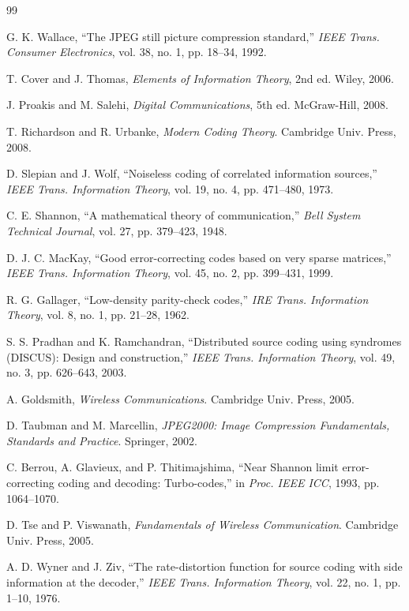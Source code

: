 \documentclass[12pt, a4paper]{article}
\begin{document}
\begin{thebibliography}{99}

G. K. Wallace, ``The JPEG still picture compression standard,'' \textit{IEEE Trans. Consumer Electronics}, vol. 38, no. 1, pp. 18--34, 1992.

T. Cover and J. Thomas, \textit{Elements of Information Theory}, 2nd ed. Wiley, 2006.

J. Proakis and M. Salehi, \textit{Digital Communications}, 5th ed. McGraw-Hill, 2008.

T. Richardson and R. Urbanke, \textit{Modern Coding Theory}. Cambridge Univ. Press, 2008.

D. Slepian and J. Wolf, ``Noiseless coding of correlated information sources,'' \textit{IEEE Trans. Information Theory}, vol. 19, no. 4, pp. 471--480, 1973.

C. E. Shannon, ``A mathematical theory of communication,'' \textit{Bell System Technical Journal}, vol. 27, pp. 379--423, 1948.

D. J. C. MacKay, ``Good error-correcting codes based on very sparse matrices,'' \textit{IEEE Trans. Information Theory}, vol. 45, no. 2, pp. 399--431, 1999.

R. G. Gallager, ``Low-density parity-check codes,'' \textit{IRE Trans. Information Theory}, vol. 8, no. 1, pp. 21--28, 1962.

S. S. Pradhan and K. Ramchandran, ``Distributed source coding using syndromes (DISCUS): Design and construction,'' \textit{IEEE Trans. Information Theory}, vol. 49, no. 3, pp. 626--643, 2003.

A. Goldsmith, \textit{Wireless Communications}. Cambridge Univ. Press, 2005.

D. Taubman and M. Marcellin, \textit{JPEG2000: Image Compression Fundamentals, Standards and Practice}. Springer, 2002.

C. Berrou, A. Glavieux, and P. Thitimajshima, ``Near Shannon limit error-correcting coding and decoding: Turbo-codes,'' in \textit{Proc. IEEE ICC}, 1993, pp. 1064--1070.

D. Tse and P. Viswanath, \textit{Fundamentals of Wireless Communication}. Cambridge Univ. Press, 2005.

A. D. Wyner and J. Ziv, ``The rate-distortion function for source coding with side information at the decoder,'' \textit{IEEE Trans. Information Theory}, vol. 22, no. 1, pp. 1--10, 1976.


\end{thebibliography}
\end{document}
